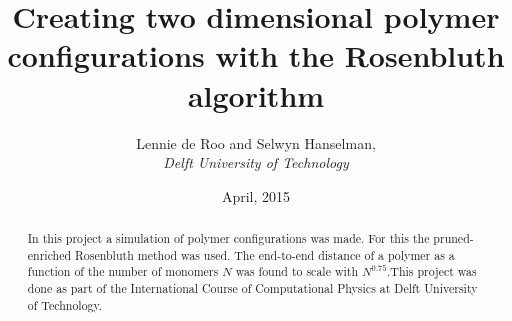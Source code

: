 \documentclass{article}
\begin{document}
\title{\textbf{Creating two dimensional polymer configurations with the Rosenbluth algorithm}}
\author{Lennie de Roo and Selwyn Hanselman, \\
 \emph{Delft University of Technology}}
\date{\normalsize{April, 2015}}
\maketitle 
\noindent \hrulefill
\begin{abstract}
In this project a simulation of polymer configurations was made. For this the pruned-enriched Rosenbluth method was used. The end-to-end distance of a polymer as a function of the number of monomers $N$ was found to scale with $N^{0.75}$.This project was done as part of the International Course of Computational Physics at Delft University of Technology.    
\end{abstract}
\hrulefill
\end{document}
